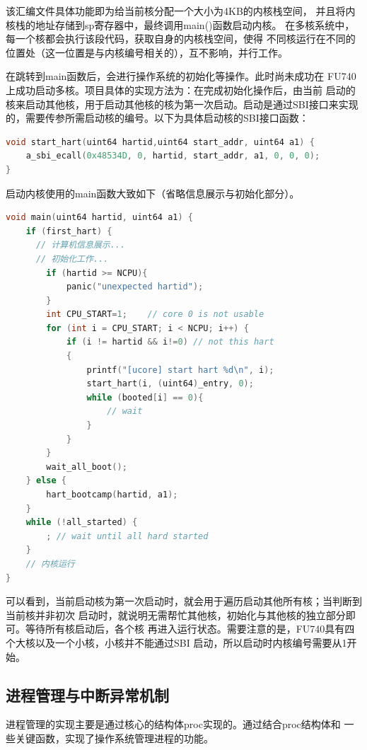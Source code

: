 \documentclass[UTF8,a4paper,10pt]{ctexart}
\begin{document}
该汇编文件具体功能即为给当前核分配一个大小为4KB的内核栈空间，
并且将内核栈的地址存储到sp寄存器中，最终调用main()函数启动内核。
在多核系统中，每一个核都会执行该段代码，获取自身的内核栈空间，使得
不同核运行在不同的位置处（这一位置是与内核编号相关的），互不影响，并行工作。

在跳转到main函数后，会进行操作系统的初始化等操作。此时尚未成功在
FU740上成功启动多核。项目具体的实现方法为：在完成初始化操作后，由当前
启动的核来启动其他核，用于启动其他核的核为第一次启动。启动是通过SBI接口来实现
的，需要传参所需启动核的编号。以下为具体启动核的SBI接口函数：

\begin{lstlisting}[title=内核镜像入口,frame=trbl,language={C}]
void start_hart(uint64 hartid,uint64 start_addr, uint64 a1) {
    a_sbi_ecall(0x48534D, 0, hartid, start_addr, a1, 0, 0, 0);
}
\end{lstlisting}

启动内核使用的main函数大致如下（省略信息展示与初始化部分）。

\begin{lstlisting}[title=内核启动的main函数,frame=trbl,language={C}]
  void main(uint64 hartid, uint64 a1) {
    if (first_hart) {
      // 计算机信息展示...
      // 初始化工作...
        if (hartid >= NCPU){
            panic("unexpected hartid");
        }
        int CPU_START=1;    // core 0 is not usable
        for (int i = CPU_START; i < NCPU; i++) {
            if (i != hartid && i!=0) // not this hart
            {
                printf("[ucore] start hart %d\n", i);
                start_hart(i, (uint64)_entry, 0);
                while (booted[i] == 0){
                    // wait
                }
            }
        }
        wait_all_boot();
    } else {
        hart_bootcamp(hartid, a1);
    }
    while (!all_started) {
        ; // wait until all hard started
    }
    // 内核运行
}
  \end{lstlisting}

可以看到，当前启动核为第一次启动时，就会用于遍历启动其他所有核；当判断到当前核并非初次
启动时，就说明无需帮忙其他核，初始化与其他核的独立部分即可。等待所有核启动后，各个核
再进入运行状态。需要注意的是，FU740具有四个大核以及一个小核，小核并不能通过SBI
启动，所以启动时内核编号需要从1开始。
\subsection{进程管理与中断异常机制}

进程管理的实现主要是通过核心的结构体proc实现的。通过结合proc结构体和
一些关键函数，实现了操作系统管理进程的功能。
\end{document}
